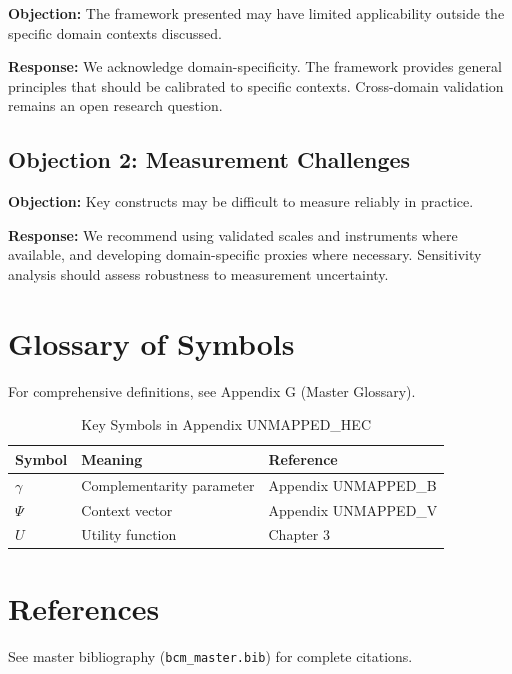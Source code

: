 \textbf{Objection:} The framework presented may have limited applicability
outside the specific domain contexts discussed.

\textbf{Response:} We acknowledge domain-specificity. The framework provides
general principles that should be calibrated to specific contexts. Cross-domain
validation remains an open research question.

\subsection{Objection 2: Measurement Challenges}

\textbf{Objection:} Key constructs may be difficult to measure reliably in
practice.

\textbf{Response:} We recommend using validated scales and instruments where
available, and developing domain-specific proxies where necessary. Sensitivity
analysis should assess robustness to measurement uncertainty.



\section{Glossary of Symbols}
\label{sec:hec-glossary}

For comprehensive definitions, see Appendix G (Master Glossary).

\begin{table}[htbp]
\centering
\caption{Key Symbols in Appendix UNMAPPED_HEC}
\begin{tabular}{lll}
\toprule
\textbf{Symbol} & \textbf{Meaning} & \textbf{Reference} \\
\midrule
$\gamma$ & Complementarity parameter & Appendix UNMAPPED_B \\
$\Psi$ & Context vector & Appendix UNMAPPED_V \\
$U$ & Utility function & Chapter 3 \\
\bottomrule
\end{tabular}
\end{table}


\section{References}
\label{sec:hec-references}

See master bibliography (\texttt{bcm\_master.bib}) for complete citations.

\nocite{bcm_master}


